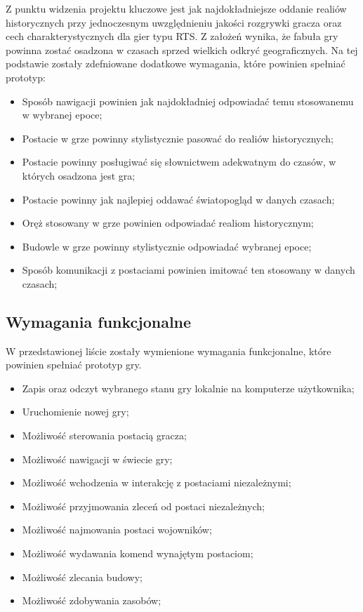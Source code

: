 Z punktu widzenia projektu kluczowe jest jak najdokładniejsze oddanie realiów historycznych przy jednoczesnym
uwzględnieniu jakości rozgrywki gracza oraz cech charakterystycznych dla gier typu RTS. Z założeń wynika, że fabuła
gry powinna zostać osadzona w czasach sprzed wielkich odkryć geograficznych. Na tej podstawie zostały zdefniowane
dodatkowe wymagania, które powinien spełniać prototyp:
\begin{itemize}
  \item Sposób nawigacji powinien jak najdokładniej odpowiadać temu stosowanemu w wybranej epoce;
  \item Postacie w grze powinny stylistycznie pasować do realiów historycznych;
  \item Postacie powinny posługiwać się słownictwem adekwatnym do czasów, w których osadzona jest gra;
  \item Postacie powinny jak najlepiej oddawać światopogląd w danych czasach;
  \item Oręż stosowany w grze powinien odpowiadać realiom historycznym;
  \item Budowle w grze powinny stylistycznie odpowiadać wybranej epoce;
  \item Sposób komunikacji z postaciami powinien imitować ten stosowany w danych czasach;
\end{itemize}

\subsection{Wymagania funkcjonalne}\label{ss:fun}
W przedstawionej liście zostały wymienione wymagania funkcjonalne, które powinien spełniać prototyp gry.

\begin{itemize}\label{list:fun}
  \item Zapis oraz odczyt wybranego stanu gry lokalnie na komputerze użytkownika;
  \item Uruchomienie nowej gry;
  \item Możliwość sterowania postacią gracza;
  \item Możliwość nawigacji w świecie gry;
  \item Możliwość wchodzenia w interakcję z postaciami niezależnymi;
  \item Możliwość przyjmowania zleceń od postaci niezależnych;
  \item Możliwość najmowania postaci wojowników;
  \item Możliwość wydawania komend wynajętym postaciom;
  \item Możliwość zlecania budowy;
  \item Możliwość zdobywania zasobów;
\end{itemize}

